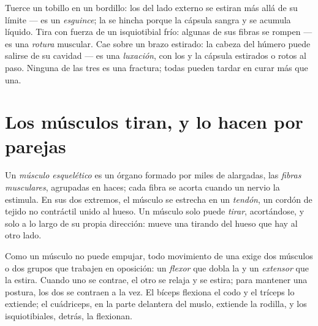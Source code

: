 \begin{example}\label{ex:g10:muscles-and-joints:injuries}
Tuerce un tobillo en un bordillo: los  del lado externo se
estiran más allá de su límite --- es un \emph{esguince}; la
 se hincha porque la cápsula sangra y se acumula líquido.
Tira con fuerza de un isquiotibial frío: algunas de sus fibras se
rompen --- es una \emph{rotura} muscular. Cae sobre un brazo estirado:
la cabeza del húmero puede salirse de su cavidad --- es una
\emph{luxación}, con los  y la cápsula estirados o rotos al
paso. Ninguna de las tres es una fractura; todas pueden tardar en curar
más que una.
\end{example}

\section{Los músculos tiran, y lo hacen por parejas}

\begin{definition}\label{def:g10:muscles-and-joints:muscle}
Un \emph{músculo esquelético} es un órgano
formado por miles de  alargadas, las \emph{fibras musculares},
agrupadas en haces; cada fibra se acorta cuando un nervio la estimula.
En sus dos extremos, el músculo se estrecha en un
\emph{tendón}, un cordón de tejido no contráctil unido al
hueso. Un músculo solo puede \emph{tirar}, acortándose, y solo a lo
largo de su propia dirección: mueve una  tirando del hueso
que hay al otro lado.
\end{definition}

\begin{proposition}\label{prop:g10:muscles-and-joints:antagonists}
Como un músculo no puede empujar, todo movimiento de una 
exige dos músculos o dos grupos que trabajen en oposición: un
\emph{flexor} que dobla la  y un \emph{extensor} que la
estira. Cuando uno se contrae, el otro se relaja y se estira; para
mantener una postura, los dos se contraen a la vez. El bíceps flexiona
el codo y el tríceps lo extiende; el cuádriceps, en la parte delantera
del muslo, extiende la rodilla, y los isquiotibiales, detrás, la
flexionan.
\end{proposition}
\admitted

